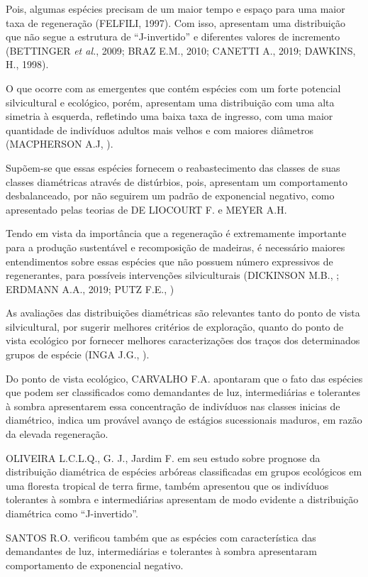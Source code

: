 \documentclass[
]{article}
\begin{document}
Pois, algumas espécies precisam de um maior tempo e espaço para uma
maior taxa de regeneração (FELFILI, 1997). Com isso, apresentam uma
distribuição que não segue a estrutura de ``J-invertido'' e diferentes
valores de incremento (BETTINGER \emph{et al.}, 2009; BRAZ E.M., 2010;
CANETTI A., 2019; DAWKINS, H., 1998).

O que ocorre com as emergentes que contém espécies com um forte
potencial silvicultural e ecológico, porém, apresentam uma distribuição
com uma alta simetria à esquerda, refletindo uma baixa taxa de ingresso,
com uma maior quantidade de indivíduos adultos mais velhos e com maiores
diâmetros (MACPHERSON A.J, ).

Supõem-se que essas espécies fornecem o reabastecimento das classes de
suas classes diamétricas através de distúrbios, pois, apresentam um
comportamento desbalanceado, por não seguirem um padrão de exponencial
negativo, como apresentado pelas teorias de DE LIOCOURT F. e MEYER A.H.

Tendo em vista da importância que a regeneração é extremamente
importante para a produção sustentável e recomposição de madeiras, é
necessário maiores entendimentos sobre essas espécies que não possuem
número expressivos de regenerantes, para possíveis intervenções
silviculturais (DICKINSON M.B., ; ERDMANN A.A., 2019; PUTZ F.E., )

As avaliações das distribuições diamétricas são relevantes tanto do
ponto de vista silvicultural, por sugerir melhores critérios de
exploração, quanto do ponto de vista ecológico por fornecer melhores
caracterizações dos traços dos determinados grupos de espécie (INGA
J.G., ).

Do ponto de vista ecológico, CARVALHO F.A. apontaram que o fato das
espécies que podem ser classificados como demandantes de luz,
intermediárias e tolerantes à sombra apresentarem essa concentração de
indivíduos nas classes inicias de diamétrico, indica um provável avanço
de estágios sucessionais maduros, em razão da elevada regeneração.

OLIVEIRA L.C.L.Q., G. J., Jardim F. em seu estudo sobre prognose da
distribuição diamétrica de espécies arbóreas classificadas em grupos
ecológicos em uma floresta tropical de terra firme, também apresentou
que os indivíduos tolerantes à sombra e intermediárias apresentam de
modo evidente a distribuição diamétrica como ``J-invertido''.

SANTOS R.O. verificou também que as espécies com característica das
demandantes de luz, intermediárias e tolerantes à sombra apresentaram
comportamento de exponencial negativo.
\end{document}
